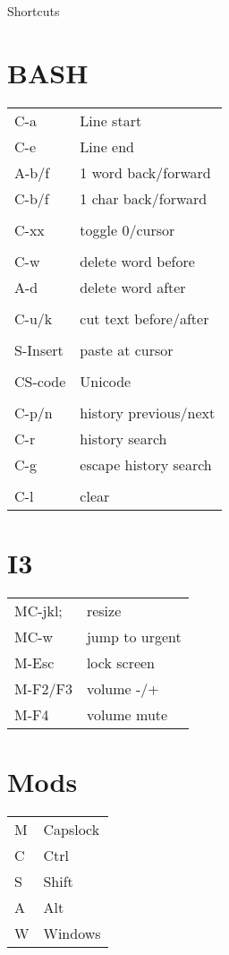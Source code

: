 \documentclass{article}
\begin{document}
\pagestyle{empty}
\begin{center}
{\LARGE Shortcuts}
\Large %

\begin{multicols}{2}

\section{BASH}
\begin{tabular}{ll}
C-a&Line start\\
C-e&Line end\\
A-b/f&1 word back/forward\\
C-b/f&1 char back/forward\\
\\
C-xx&toggle 0/cursor\\
\\
C-w&delete word before\\
A-d&delete word after\\
\\
C-u/k&cut text before/after\\
\\
S-Insert&paste at cursor\\
\\
CS-code&Unicode\\
\\
C-p/n&history previous/next\\
C-r&history search\\
C-g&escape history search\\
\\
C-l&clear\\

\end{tabular}

\section{I3}
\begin{tabular}{ll}
MC-jkl;&resize\\
MC-w&jump to urgent\\
M-Esc&lock screen\\
M-F2/F3&volume -/+\\
M-F4&volume mute\\
\end{tabular}

\section{Mods}
\begin{tabular}{ll}
M&Capslock\\
C&Ctrl\\
S&Shift\\
A&Alt\\
W&Windows\\
\end{tabular}

\end{multicols}
\end{center}
\end{document}
